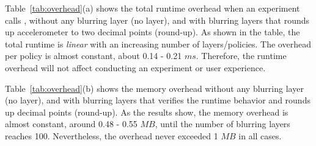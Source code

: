 \begin{comment}
\begin{figure}
\center{\texttt{[image: figs/time.pdf]}}
\caption{\small Overhead incurred by running varying number of blurring 
layers with experiment code. Blue points show the execution time of 
an experiment using blurring layers without verifying the runtime behavior. 
Black points show the execution time with the runtime behavior verified. 
\yanyan{remove blue and add a base line?}
\label{fig-time}}
\end{figure}

Figure~\ref{fig-time} shows the runtime overhead of using varying number of 
blurring layers, i.e., policies, to protect sensor data. The experiment code 
calls \path{get_battery()} from the Repy sandbox. Each point in the 
figure is averaged over 100 iterations. Blue points show the execution time of 
using blurring layers without verifying the runtime behavior. Black points 
show the execution time with the runtime behavior verified, i.e., using a 
contract to check arguments, return values and exceptions. Note that a 
contract checks for both mutable and immutable data types~\cite{muta} 
for arguments and return values. When the number of layers is below 10, 
the runtime is slightly increased from 10$^{-5} s$ to 10$^{-4} s$. Although
the runtime overhead is higher with more layers, as Table~\ref{tab:policy} 
and \ref{tab:policy-continued} show, most projects need less than 10
policies. \yanyan{we don't mention contracts in paper anymore.}
\end{comment}

Table~\ref{tab:overhead}(a) shows the total runtime overhead when an experiment
calls , without any blurring layer (no layer), 
and with blurring layers that rounds up accelerometer to two decimal 
points (round-up). As shown in the table, the total runtime is \textit{linear} with an 
increasing number of layers/policies. The overhead per policy is almost
constant, %
about 0.14 - 0.21 $ms$. 
Therefore, the runtime overhead will not affect conducting an 
experiment or user experience.

Table~\ref{tab:overhead}(b) shows the memory overhead without any blurring layer 
(no layer), and with blurring layers that verifies the runtime behavior and rounds up 
decimal points (round-up). As the results show, the memory overhead is almost
constant, around 0.48 - 0.55 $MB$, until the number of blurring layers reaches 100. 
Nevertheless, the overhead never exceeded 1 $MB$ in all cases. 

